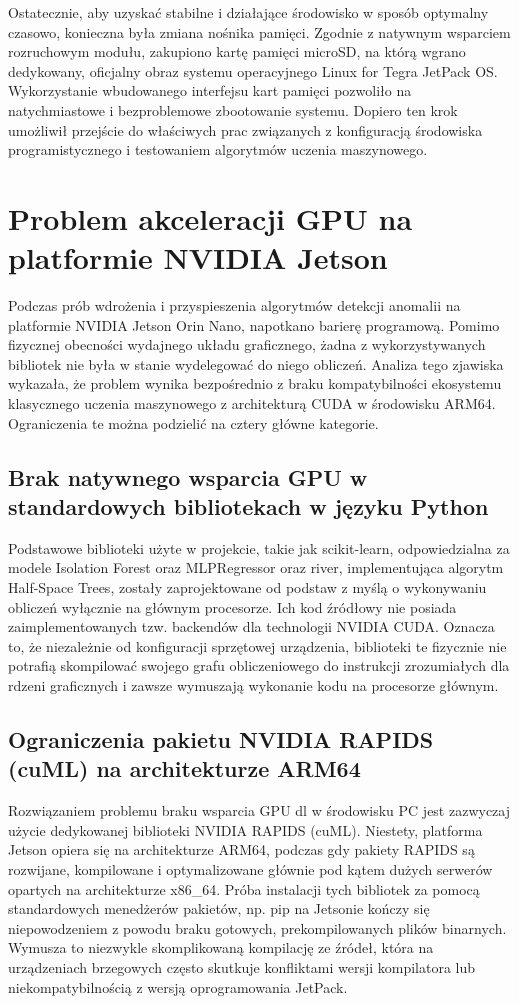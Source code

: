 \documentclass[12pt,twoside]{article}
\begin{document}
Ostatecznie, aby uzyskać stabilne i działające środowisko w sposób optymalny czasowo, konieczna była zmiana nośnika pamięci. Zgodnie z natywnym wsparciem rozruchowym modułu, zakupiono kartę pamięci microSD, na którą wgrano dedykowany, oficjalny obraz systemu operacyjnego Linux for Tegra JetPack OS. Wykorzystanie wbudowanego interfejsu kart pamięci pozwoliło na natychmiastowe i bezproblemowe zbootowanie systemu. Dopiero ten krok umożliwił przejście do właściwych prac związanych z konfiguracją środowiska programistycznego i testowaniem algorytmów uczenia maszynowego.


\section{Problem akceleracji GPU na platformie NVIDIA Jetson}
Podczas prób wdrożenia i przyspieszenia algorytmów detekcji anomalii na platformie NVIDIA Jetson Orin Nano, napotkano barierę programową. Pomimo fizycznej obecności wydajnego układu graficznego, żadna z wykorzystywanych bibliotek nie była w stanie wydelegować do niego obliczeń. Analiza tego zjawiska wykazała, że problem wynika bezpośrednio z braku kompatybilności ekosystemu klasycznego uczenia maszynowego z architekturą CUDA w środowisku ARM64. Ograniczenia te można podzielić na cztery główne kategorie.
\subsection{Brak natywnego wsparcia GPU w standardowych bibliotekach w języku Python}
Podstawowe biblioteki użyte w projekcie, takie jak scikit-learn, odpowiedzialna za modele Isolation Forest oraz MLPRegressor oraz river, implementująca algorytm Half-Space Trees, zostały zaprojektowane od podstaw z myślą o wykonywaniu obliczeń wyłącznie na głównym procesorze. Ich kod źródłowy nie posiada zaimplementowanych tzw. backendów dla technologii NVIDIA CUDA. Oznacza to, że niezależnie od konfiguracji sprzętowej urządzenia, biblioteki te fizycznie nie potrafią skompilować swojego grafu obliczeniowego do instrukcji zrozumiałych dla rdzeni graficznych i zawsze wymuszają wykonanie kodu na procesorze głównym.
\subsection{Ograniczenia pakietu NVIDIA RAPIDS (cuML) na architekturze ARM64}
Rozwiązaniem problemu braku wsparcia GPU dl w środowisku PC jest zazwyczaj użycie dedykowanej biblioteki NVIDIA RAPIDS (cuML). Niestety, platforma Jetson opiera się na architekturze ARM64, podczas gdy pakiety RAPIDS są rozwijane, kompilowane i optymalizowane głównie pod kątem dużych serwerów opartych na architekturze x86\_64. Próba instalacji tych bibliotek za pomocą standardowych menedżerów pakietów, np. pip na Jetsonie kończy się niepowodzeniem z powodu braku gotowych, prekompilowanych plików binarnych. Wymusza to niezwykle skomplikowaną kompilację ze źródeł, która na urządzeniach brzegowych często skutkuje konfliktami wersji kompilatora lub niekompatybilnością z wersją oprogramowania JetPack.
\end{document}
